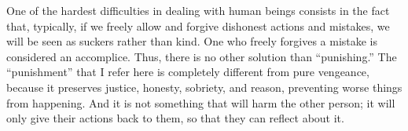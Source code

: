 \par One of the hardest difficulties in dealing with human beings consists in the fact that, typically, if we freely allow and forgive dishonest actions and mistakes, we will be seen as suckers rather than kind. One who freely forgives a mistake is considered an accomplice. Thus, there is no other solution than \enquote{punishing.} The \enquote{punishment} that I refer here is completely different from pure vengeance, because it preserves justice, honesty, sobriety, and reason, preventing worse things from happening. And it is not something that will harm the other person; it will only give their actions back to them, so that they can reflect about it.